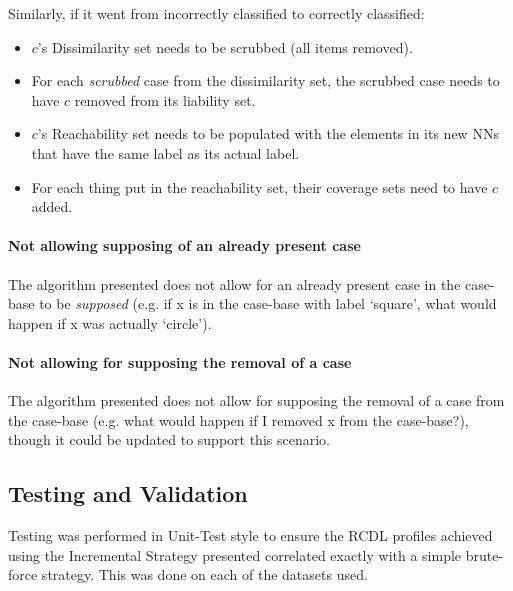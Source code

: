 \documentclass[a4paper,11pt]{report}
\begin{document}
Similarly, if it went from incorrectly classified to correctly classified:
\begin{itemize}
	\item $c$'s Dissimilarity set needs to be scrubbed (all items removed).
	\item For each \emph{scrubbed} case from the dissimilarity set, the scrubbed case needs to have $c$ removed from its liability set.
	\item $c$'s Reachability set needs to be populated with the elements in its new NNs that have the same label as its actual label.
	\item For each thing put in the reachability set, their coverage sets need to have $c$ added.
\end{itemize}

\paragraph{Not allowing supposing of an already present case}
The algorithm presented does not allow for an already present case in the case-base to be \emph{supposed} (e.g. if x is in the case-base with label `square', what would happen if x was actually `circle').

\paragraph{Not allowing for supposing the removal of a case}
The algorithm presented does not allow for supposing the removal of a case from the case-base (e.g. what would happen if I removed x from the case-base?), though it could be updated to support this scenario.

\subsection{Testing and Validation}
Testing was performed in Unit-Test style to ensure the RCDL profiles achieved using the Incremental Strategy presented correlated exactly with a simple brute-force strategy. This was done on each of the datasets used.

\vspace{10pt}
\end{document}
